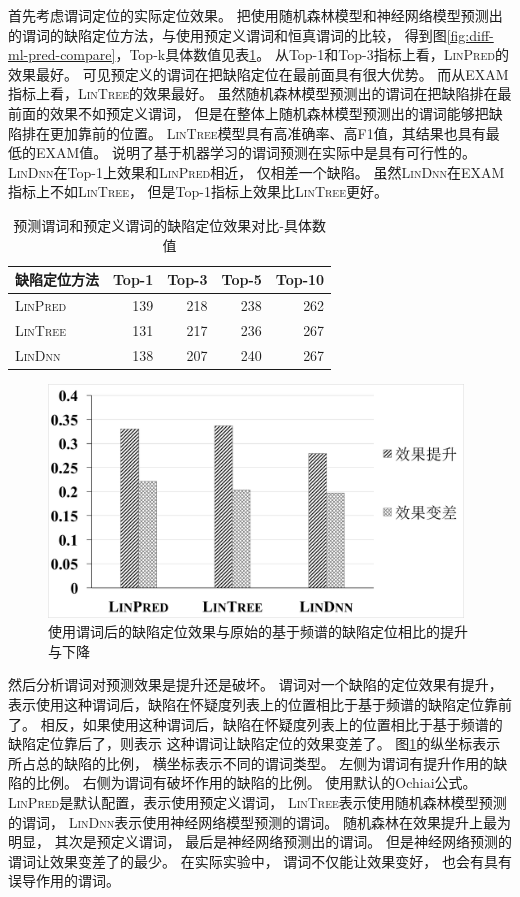 首先考虑谓词定位的实际定位效果。
把使用随机森林模型和神经网络模型预测出的谓词的缺陷定位方法，与使用预定义谓词和恒真谓词的比较，
得到图\ref{fig:diff-ml-pred-compare}，Top-k具体数值见表\ref{diff-ml-pred-compare-data}。
从Top-1和Top-3指标上看，\textsc{LinPred}的效果最好。
可见预定义的谓词在把缺陷定位在最前面具有很大优势。
而从EXAM指标上看，\textsc{LinTree}的效果最好。
虽然随机森林模型预测出的谓词在把缺陷排在最前面的效果不如预定义谓词，
但是在整体上随机森林模型预测出的谓词能够把缺陷排在更加靠前的位置。
\textsc{LinTree}模型具有高准确率、高F1值，其结果也具有最低的EXAM值。
说明了基于机器学习的谓词预测在实际中是具有可行性的。
\textsc{LinDnn}在Top-1上效果和\textsc{LinPred}相近，
仅相差一个缺陷。
虽然\textsc{LinDnn}在EXAM指标上不如\textsc{LinTree}，
但是Top-1指标上效果比\textsc{LinTree}更好。

\begin{table}
\centering
\begin{tabular}{|l|r|r|r|r|}
\hline
缺陷定位方法 & Top-1 & Top-3 & Top-5 & Top-10 \\
\hline
\textsc{LinPred} & 139 & 218 & 238 & 262 \\
\hline
\textsc{LinTree} & 131 & 217 & 236 & 267 \\
\hline
\textsc{LinDnn} & 138 & 207 & 240 & 267 \\
\hline
\end{tabular}
\caption{预测谓词和预定义谓词的缺陷定位效果对比-具体数值}
\label{diff-ml-pred-compare-data}
\end{table}

\begin{figure}[tbp] 
\centering 
\includegraphics[width=11cm]{figure/improve-deteriorate-all} 
\caption{使用谓词后的缺陷定位效果与原始的基于频谱的缺陷定位相比的提升与下降} 
\label{fig:improve-deteriorate-all}
\end{figure}

然后分析谓词对预测效果是提升还是破坏。
谓词对一个缺陷的定位效果有提升，表示使用这种谓词后，缺陷在怀疑度列表上的位置相比于基于频谱的缺陷定位靠前了。
相反，如果使用这种谓词后，缺陷在怀疑度列表上的位置相比于基于频谱的缺陷定位靠后了，则表示
这种谓词让缺陷定位的效果变差了。
图\ref{fig:improve-deteriorate-all}的纵坐标表示所占总的缺陷的比例，
横坐标表示不同的谓词类型。
左侧为谓词有提升作用的缺陷的比例。
右侧为谓词有破坏作用的缺陷的比例。
使用默认的Ochiai公式。
\textsc{LinPred}是默认配置，表示使用预定义谓词，
\textsc{LinTree}表示使用随机森林模型预测的谓词，
\textsc{LinDnn}表示使用神经网络模型预测的谓词。
随机森林在效果提升上最为明显，
其次是预定义谓词，
最后是神经网络预测出的谓词。
但是神经网络预测的谓词让效果变差了的最少。
在实际实验中，
谓词不仅能让效果变好，
也会有具有误导作用的谓词。

